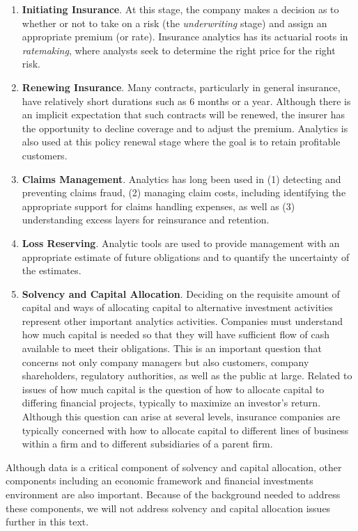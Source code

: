 \documentclass[]{book}
\theoremstyle{definition}
\theoremstyle{definition}
\theoremstyle{definition}
\theoremstyle{remark}
\begin{document}
\begin{enumerate}
\def\labelenumi{\arabic{enumi}.}
\item
  \textbf{Initiating Insurance}. At this stage, the company makes a
  decision as to whether or not to take on a risk (the
  \emph{underwriting} stage) and assign an appropriate premium (or
  rate). Insurance analytics has its actuarial roots in
  \emph{ratemaking}, where analysts seek to determine the right price
  for the right risk.
\item
  \textbf{Renewing Insurance}. Many contracts, particularly in general
  insurance, have relatively short durations such as 6 months or a year.
  Although there is an implicit expectation that such contracts will be
  renewed, the insurer has the opportunity to decline coverage and to
  adjust the premium. Analytics is also used at this policy renewal
  stage where the goal is to retain profitable customers.
\item
  \textbf{Claims Management}. Analytics has long been used in (1)
  detecting and preventing claims fraud, (2) managing claim costs,
  including identifying the appropriate support for claims handling
  expenses, as well as (3) understanding excess layers for reinsurance
  and retention.
\item
  \textbf{Loss Reserving}. Analytic tools are used to provide management
  with an appropriate estimate of future obligations and to quantify the
  uncertainty of the estimates.
\item
  \textbf{Solvency and Capital Allocation}. Deciding on the requisite
  amount of capital and ways of allocating capital to alternative
  investment activities represent other important analytics activities.
  Companies must understand how much capital is needed so that they will
  have sufficient flow of cash available to meet their obligations. This
  is an important question that concerns not only company managers but
  also customers, company shareholders, regulatory authorities, as well
  as the public at large. Related to issues of how much capital is the
  question of how to allocate capital to differing financial projects,
  typically to maximize an investor's return. Although this question can
  arise at several levels, insurance companies are typically concerned
  with how to allocate capital to different lines of business within a
  firm and to different subsidiaries of a parent firm.
\end{enumerate}

Although data is a critical component of solvency and capital
allocation, other components including an economic framework and
financial investments environment are also important. Because of the
background needed to address these components, we will not address
solvency and capital allocation issues further in this text.
\end{document}
